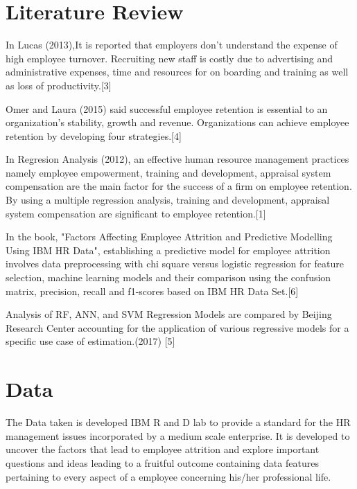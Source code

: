 \documentclass[a4paper, 14 pt, conference]{ieeeconf}
\begin{document}
 
 
 
 
 

\section{Literature Review}
In Lucas  (2013),It is  reported  that  employers don’t  understand the expense of high employee turnover. Recruiting new staff is costly due to advertising  and  administrative  expenses,  time  and  resources  for  on boarding  and  training  as  well  as  loss  of  productivity.[3] 

Omer and Laura (2015) said successful   employee   retention   is   essential   to   an   organization’s   stability,   growth   and   revenue.      Organizations   can   achieve   employee   retention   by   developing   four   strategies.[4]

In Regresion Analysis (2012), an  effective  human   resource  management  practices  namely   employee  empowerment, training  and  development,  appraisal  system  compensation  are  the  main  factor  for  the success of a firm on employee retention. By using a multiple  regression  analysis,  training  and  development,  appraisal  system compensation are significant to employee retention.[1]

 In the book, "Factors Affecting Employee Attrition and Predictive Modelling Using IBM HR Data", establishing a predictive model for employee attrition involves data preprocessing with chi square versus logistic regression for feature selection, machine learning models and their comparison using the confusion matrix, precision, recall and f1-scores based on IBM HR Data Set.[6]
 
Analysis of RF, ANN, and SVM Regression Models are compared by Beijing Research Center accounting for the application of various regressive models for a specific use case of estimation.(2017)
[5] 



\section{Data}
The Data taken is developed IBM R and D lab to provide a standard for the HR management issues incorporated by a medium scale enterprise. It is developed to uncover the factors that lead to employee attrition and explore important questions and ideas leading to a fruitful outcome containing data features pertaining to every aspect of a employee concerning his/her professional life.
\end{document}
